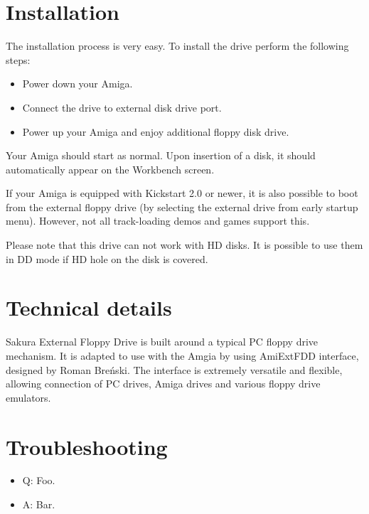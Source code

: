 \documentclass[10pt,a4paper]{article}
\begin{document}
\section*{Installation}

The installation process is very easy. To install the drive perform the following steps:

\begin{itemize}
	\item Power down your Amiga.
	\item Connect the drive to external disk drive port.
	\item Power up your Amiga and enjoy additional floppy disk drive.
\end{itemize}

Your Amiga should start as normal. Upon insertion of a disk, it should automatically appear on the Workbench screen.

If your Amiga is equipped with Kickstart 2.0 or newer, it is also possible to boot from the external floppy drive (by selecting the external drive from early startup menu). However, not all track-loading demos and games support this.

Please note that this drive can not work with HD disks. It is possible to use them in DD mode if HD hole on the disk is covered. 

\section*{Technical details}


Sakura External Floppy Drive is built around a typical PC floppy drive mechanism. It is adapted to use with the Amgia by using AmiExtFDD interface, designed by Roman Breński. The interface is extremely versatile and flexible, allowing connection of PC drives, Amiga drives and various floppy drive emulators.

\section*{Troubleshooting}

\begin{itemize}
	\item Q: Foo.
	\item A: Bar.
\end{itemize}
\end{document}

